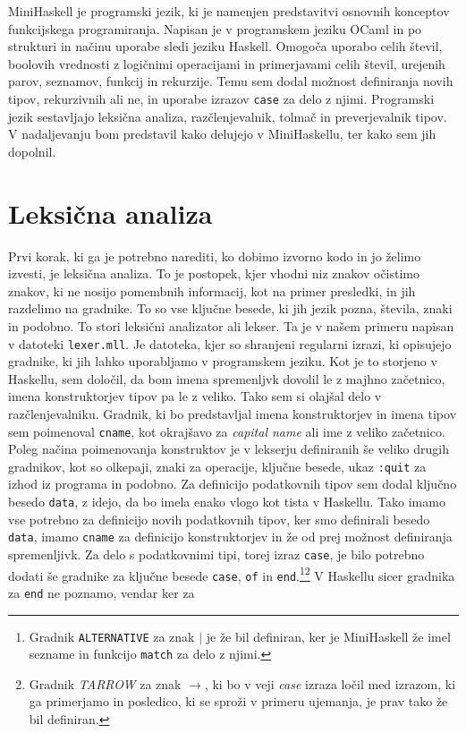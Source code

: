 \documentclass[12pt,a4paper,openany]{book}
\begin{document}
MiniHaskell je programski jezik, ki je namenjen predstavitvi osnovnih konceptov funkcijskega programiranja. Napisan je v programskem jeziku 
OCaml in po strukturi in načinu uporabe sledi jeziku Haskell. Omogoča uporabo celih števil, boolovih vrednosti z logičnimi operacijami in primerjavami 
celih števil, urejenih parov, seznamov, funkcij in rekurzije. Temu sem dodal možnost definiranja novih tipov, rekurzivnih ali ne, in 
uporabe izrazov \lstinline{case} za delo z njimi. Programski jezik sestavljajo leksična analiza, razčlenjevalnik, tolmač in preverjevalnik tipov. V nadaljevanju bom predstavil kako 
delujejo v MiniHaskellu, ter kako sem jih dopolnil.

\section{Leksična analiza}
Prvi korak, ki ga je potrebno narediti, ko dobimo izvorno kodo in jo želimo izvesti, je leksična analiza. To je postopek, kjer vhodni niz znakov očistimo znakov, ki ne nosijo pomembnih informacij, kot 
na primer presledki, in jih razdelimo na gradnike. To so vse ključne besede, ki jih jezik pozna, števila, znaki in podobno. To stori leksični analizator ali lekser. 
Ta je v našem primeru napisan v datoteki \lstinline{lexer.mll}. Je datoteka, kjer so shranjeni regularni izrazi, ki opisujejo gradnike, ki jih lahko uporabljamo v programskem jeziku. 
Kot je to storjeno v Haskellu, sem določil, da bom imena spremenljvk dovolil le z majhno začetnico, imena konstruktorjev tipov pa le z veliko. Tako sem si olajšal delo v razčlenjevalniku. 
Gradnik, ki bo predstavljal imena konstruktorjev in imena tipov sem poimenoval \lstinline{cname}, kot okrajšavo za \textit{capital name} ali ime z veliko začetnico. Poleg načina poimenovanja 
konstruktov je v lekserju definiranih še veliko drugih gradnikov, kot so olkepaji, znaki za operacije, ključne besede, ukaz \lstinline{:quit} za izhod iz programa 
in podobno. Za definicijo podatkovnih tipov sem dodal ključno besedo \lstinline{data}, z idejo, da bo imela enako vlogo kot tista v Haskellu. Tako imamo vse potrebno za 
definicijo novih podatkovnih tipov, ker smo definirali besedo \lstinline{data}, imamo \lstinline{cname} za definicijo konstruktorjev in že od prej možnost definiranja spremenljivk.
Za delo s podatkovnimi tipi, torej izraz \lstinline{case}, je bilo potrebno dodati še gradnike za ključne besede \lstinline{case}, \lstinline{of} in \lstinline{end}.\footnote{Gradnik \lstinline{ALTERNATIVE} 
za znak $\mid$ je že bil definiran, ker je MiniHaskell že imel sezname in funkcijo \lstinline{match} za delo z njimi.}\footnote{Gradnik \emph{TARROW} za znak \emph{$\rightarrow$}, ki bo v veji \emph{case} 
izraza ločil med izrazom, ki ga primerjamo in posledico, ki se sproži v primeru ujemanja, je prav tako že bil definiran.} V Haskellu sicer gradnika za \lstinline{end} ne poznamo, vendar ker za 
\end{document}
